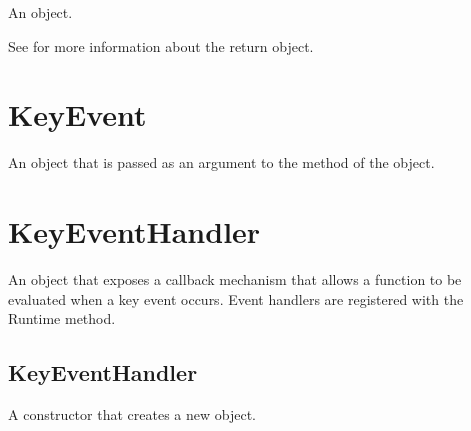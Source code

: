 \documentclass[letterpaper,12pt,english,openany,oneside]{sphinxmanual}
\begin{document}
\label{\detokenize{JS_3D_API:syntax-32}}

\begin{sphinxVerbatim}[commandchars=\\\{\}]
 
\end{sphinxVerbatim}
\label{\detokenize{JS_3D_API:parameters-21}}

\label{\detokenize{JS_3D_API:section-34}}\label{\detokenize{JS_3D_API:returns-32}}

An  object.

See  for more information about the return object.


\section{KeyEvent}
\label{\detokenize{JS_3D_API:keyevent}}
An object that is passed as an argument to the  method of the  object.

\label{\detokenize{JS_3D_API:properties-12}}


\section{KeyEventHandler}
\label{\detokenize{JS_3D_API:keyeventhandler}}
An object that exposes a callback mechanism that allows a function to be evaluated when a key event occurs. Event handlers are registered with the Runtime  method.


\subsection{KeyEventHandler}
\label{\detokenize{JS_3D_API:keyeventhandler-1}}\label{\detokenize{JS_3D_API:id9}}
A constructor that creates a new  object.

\label{\detokenize{JS_3D_API:syntax-33}}

\begin{sphinxVerbatim}[commandchars=\\\{\}]
 
\end{sphinxVerbatim}
\label{\detokenize{JS_3D_API:returns-33}}
\end{document}
